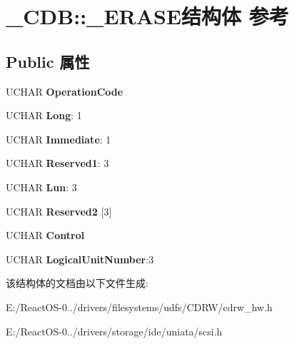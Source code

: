 \hypertarget{struct___c_d_b_1_1___e_r_a_s_e}{}\section{\+\_\+\+C\+DB\+:\+:\+\_\+\+E\+R\+A\+S\+E结构体 参考}
\label{struct___c_d_b_1_1___e_r_a_s_e}
\subsection*{Public 属性}
\begin{DoxyCompactItemize}
\item 
\mbox{\label{struct___c_d_b_1_1___e_r_a_s_e_a80cfb88f1f24969d2adef5d31ddd62df}} 
U\+C\+H\+AR {\bfseries Operation\+Code}
\item 
\mbox{\label{struct___c_d_b_1_1___e_r_a_s_e_a1cb04485a8a0cd26633036c35867b0c7}} 
U\+C\+H\+AR {\bfseries Long}\+: 1
\item 
\mbox{\label{struct___c_d_b_1_1___e_r_a_s_e_a849ba0a7d8db92e36999eef671a14f79}} 
U\+C\+H\+AR {\bfseries Immediate}\+: 1
\item 
\mbox{\label{struct___c_d_b_1_1___e_r_a_s_e_a0294a402d1aae21b3540efb53b33099d}} 
U\+C\+H\+AR {\bfseries Reserved1}\+: 3
\item 
\mbox{\label{struct___c_d_b_1_1___e_r_a_s_e_a992b76065aae311d4c678cddbe09393e}} 
U\+C\+H\+AR {\bfseries Lun}\+: 3
\item 
\mbox{\label{struct___c_d_b_1_1___e_r_a_s_e_a1f5e4e22c1e4d6f8afade05be2c7a7ba}} 
U\+C\+H\+AR {\bfseries Reserved2} \mbox{[}3\mbox{]}
\item 
\mbox{\label{struct___c_d_b_1_1___e_r_a_s_e_a7ad79d66d380c8d37c2a9284fa623edc}} 
U\+C\+H\+AR {\bfseries Control}
\item 
\mbox{\label{struct___c_d_b_1_1___e_r_a_s_e_a6a57375f8ca340464c8d2c57875f094b}} 
U\+C\+H\+AR {\bfseries Logical\+Unit\+Number}\+:3
\end{DoxyCompactItemize}


该结构体的文档由以下文件生成\+:\begin{DoxyCompactItemize}
\item 
E\+:/\+React\+O\+S-\/0../drivers/filesystems/udfs/\+C\+D\+R\+W/cdrw\+\_\+hw.\+h\item 
E\+:/\+React\+O\+S-\/0../drivers/storage/ide/uniata/scsi.\+h\end{DoxyCompactItemize}
